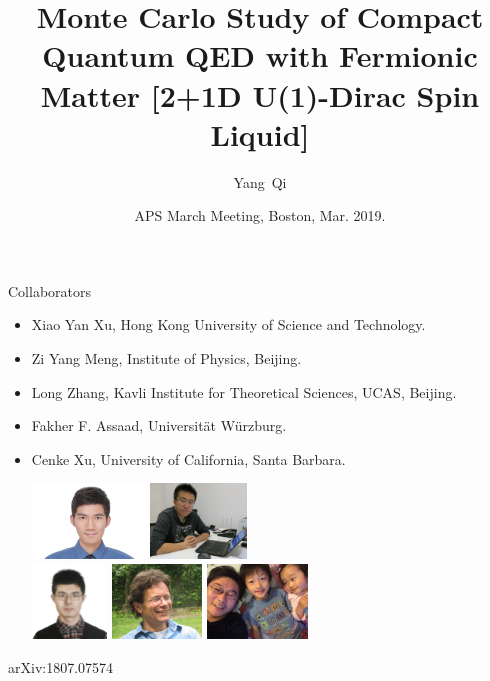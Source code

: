 \documentclass[xcolor=table, 10pt, aspectratio=169]{beamer}
\title[U1SL] %
{Monte Carlo Study of Compact Quantum QED with Fermionic Matter [2+1D U(1)-Dirac Spin Liquid]}
\author[Y Qi] %
{Yang~Qi}
\institute[Fudan] %
{
Department of Physics, Fudan University.
}
\date{APS March Meeting, Boston, Mar. 2019.}
\begin{document}
\begin{frame}
  \titlepage
\end{frame}

\begin{frame}{Collaborators}
\begin{itemize}
\item Xiao Yan Xu, Hong Kong University of Science and Technology.
\item Zi Yang Meng, Institute of Physics, Beijing.
\item Long Zhang, Kavli Institute for Theoretical Sciences, UCAS, Beijing.
\item Fakher F. Assaad, Universit\"at W\"urzburg.
\item Cenke Xu, University of California, Santa Barbara.
\begin{center}
  \includegraphics[height=2cm]{../people/xiaoyanxu}
  \includegraphics[height=2cm]{../people/ziyangmeng}\\
  \includegraphics[height=2cm]{../people/zhanglong}
  \includegraphics[height=2cm]{../people/fakher}
  \includegraphics[height=2cm]{../people/cenke}
\end{center}
\end{itemize}
\begin{center}
  \small arXiv:1807.07574
\end{center}
\end{frame}
\end{document}
